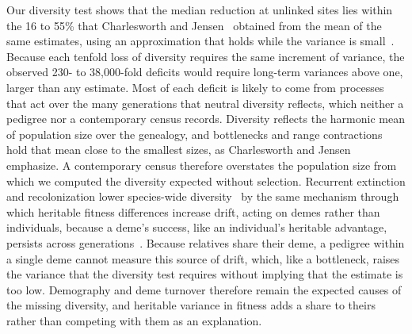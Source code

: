 \documentclass{article}
\begin{document}
Our diversity test shows that the median reduction at unlinked sites lies within the 16 to 55\% that Charlesworth and Jensen~\cite{charlesworth2022} obtained from the mean of the same estimates, using an approximation that holds while the variance is small~\cite{santiago1995,santiago1998}. Because each tenfold loss of diversity requires the same increment of variance, the observed 230- to 38,000-fold deficits would require long-term variances above one, larger than any estimate. Most of each deficit is likely to come from processes that act over the many generations that neutral diversity reflects, which neither a pedigree nor a contemporary census records. Diversity reflects the harmonic mean of population size over the genealogy, and bottlenecks and range contractions hold that mean close to the smallest sizes, as Charlesworth and Jensen emphasize. A contemporary census therefore overstates the population size from which we computed the diversity expected without selection. Recurrent extinction and recolonization lower species-wide diversity~\cite{pannell2000} by the same mechanism through which heritable fitness differences increase drift, acting on demes rather than individuals, because a deme's success, like an individual's heritable advantage, persists across generations~\cite{whitlock1997}. Because relatives share their deme, a pedigree within a single deme cannot measure this source of drift, which, like a bottleneck, raises the variance that the diversity test requires without implying that the estimate is too low. Demography and deme turnover therefore remain the expected causes of the missing diversity, and heritable variance in fitness adds a share to theirs rather than competing with them as an explanation.
\end{document}

